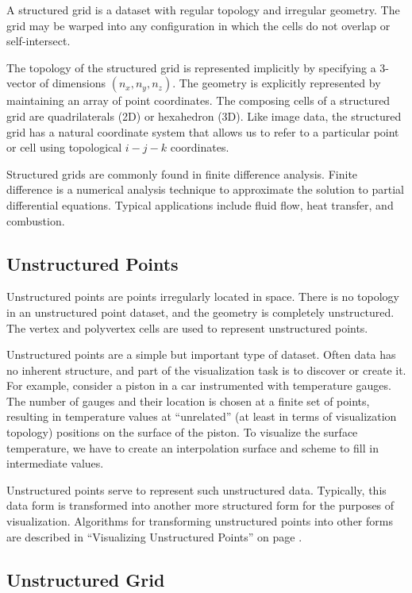 A structured grid is a dataset with regular topology and irregular geometry. The grid may be warped into any configuration in which the cells do not overlap or self-intersect.

The topology of the structured grid is represented implicitly by specifying a 3-vector of dimensions $(n_x, n_y, n_z)$. The geometry is explicitly represented by maintaining an array of point coordinates. The composing cells of a structured grid are quadrilaterals (2D) or hexahedron (3D). Like image data, the structured grid has a natural coordinate system that allows us to refer to a particular point or cell using topological $i-j-k$ coordinates.

Structured grids are commonly found in finite difference analysis. Finite difference is a numerical analysis technique to approximate the solution to partial differential equations. Typical applications include fluid flow, heat transfer, and combustion.

\subsection{Unstructured Points}

Unstructured points are points irregularly located in space. There is no topology in an unstructured point dataset, and the geometry is completely unstructured. The vertex and polyvertex cells are used to represent unstructured points.

Unstructured points are a simple but important type of dataset. Often data has no inherent structure, and part of the visualization task is to discover or create it. For example, consider a piston in a car instrumented with temperature gauges. The number of gauges and their location is chosen at a finite set of points, resulting in temperature values at “unrelated” (at least in terms of visualization topology) positions on the surface of the piston. To visualize the surface temperature, we have to create an interpolation surface and scheme to fill in intermediate values.

Unstructured points serve to represent such unstructured data. Typically, this data form is transformed into another more structured form for the purposes of visualization. Algorithms for transforming unstructured points into other forms are described in ``Visualizing Unstructured Points'' on page \pageref{subsec:visualizing_unstructured_points}.

\subsection{Unstructured Grid}

